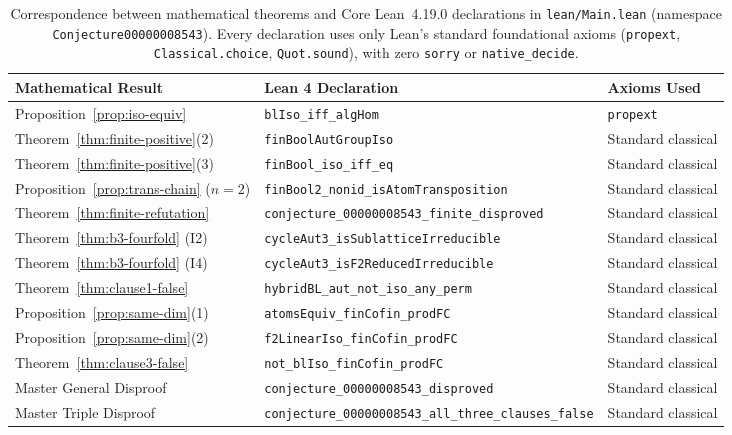 \documentclass[11pt]{article}
\theoremstyle{definition}
\theoremstyle{remark}
\begin{document}
\begin{table}[ht]
\centering
\caption{Correspondence between mathematical theorems and Core Lean~4.19.0 declarations in \texttt{lean/Main.lean} (namespace \texttt{Conjecture00000008543}). Every declaration uses only Lean's standard foundational axioms (\texttt{propext}, \texttt{Classical.choice}, \texttt{Quot.sound}), with zero \texttt{sorry} or \texttt{native\_decide}.}
\label{tab:lean-map}
\medskip
{\small
\begin{tabular}{@{}lll@{}}
\toprule
Mathematical Result & Lean 4 Declaration & Axioms Used \\
\midrule
Proposition~\ref{prop:iso-equiv} & \texttt{blIso\_iff\_algHom} & \texttt{propext} \\
Theorem~\ref{thm:finite-positive}(2) & \texttt{finBoolAutGroupIso} & Standard classical \\
Theorem~\ref{thm:finite-positive}(3) & \texttt{finBool\_iso\_iff\_eq} & Standard classical \\
Proposition~\ref{prop:trans-chain} ($n=2$) & \texttt{finBool2\_nonid\_isAtomTransposition} & Standard classical \\
Theorem~\ref{thm:finite-refutation} & \texttt{conjecture\_00000008543\_finite\_disproved} & Standard classical \\
Theorem~\ref{thm:b3-fourfold} (I2) & \texttt{cycleAut3\_isSublatticeIrreducible} & Standard classical \\
Theorem~\ref{thm:b3-fourfold} (I4) & \texttt{cycleAut3\_isF2ReducedIrreducible} & Standard classical \\
Theorem~\ref{thm:clause1-false} & \texttt{hybridBL\_aut\_not\_iso\_any\_perm} & Standard classical \\
Proposition~\ref{prop:same-dim}(1) & \texttt{atomsEquiv\_finCofin\_prodFC} & Standard classical \\
Proposition~\ref{prop:same-dim}(2) & \texttt{f2LinearIso\_finCofin\_prodFC} & Standard classical \\
Theorem~\ref{thm:clause3-false} & \texttt{not\_blIso\_finCofin\_prodFC} & Standard classical \\
Master General Disproof & \texttt{conjecture\_00000008543\_disproved} & Standard classical \\
Master Triple Disproof & \texttt{conjecture\_00000008543\_all\_three\_clauses\_false} & Standard classical \\
\bottomrule
\end{tabular}
}
\end{table}
\end{document}
